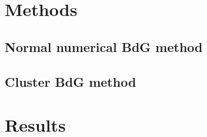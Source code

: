 \documentclass[11pt,twocolumn]{article}
\begin{document}
\section{Methods}\label{sec:methods}
\subsection{Normal numerical BdG method}
\subsection{Cluster BdG method}

\section{Results}\label{sec:results}
\end{document}

